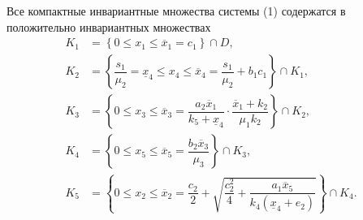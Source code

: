 \documentclass[14pt,a4paper]{extarticle}
\begin{document}
	\begin{theorem}\label{th:inv_comp}
		Все компактные инвариантные множества системы (1) содержатся в положительно инвариантных множествах
		\begin{align*}
			K_1 &=\left\{0 \leqslant x_1 \leqslant \overline{x}_1 = c_1\right\}\cap D,\\[6pt]
			K_2 &=\left\{\dfrac{s_1}{\mu_2} = \underline{x}_4 \leqslant x_4 \leqslant \overline{x}_4 = \dfrac{s_1}{\mu_2} + b_1c_1\right\}\cap K_1,\\[6pt]
			K_3 &=\left\{0 \leqslant x_3 \leqslant \overline{x}_3 = \dfrac{a_2\overline{x}_1}{k_5+\underline{x}_4}\cdot\dfrac{\overline{x}_1+k_2}{\mu_1k_2}\right\}\cap K_2,\\[6pt]
			K_4 &=\left\{0 \leqslant x_5 \leqslant \overline{x}_5 = \dfrac{b_2\overline{x}_3}{\mu_3}\right\}\cap K_3,\\[6pt]
			K_5 &=\left\{0 \leqslant x_2 \leqslant \overline{x}_2 =  \dfrac{c_2}{2}+\sqrt{\dfrac{c_2^2}{4}+\dfrac{a_1\overline{x}_5}{k_4(\underline{x}_4+e_2)}}\right\}\cap K_4.
		\end{align*}
	\end{theorem}
\end{document}
